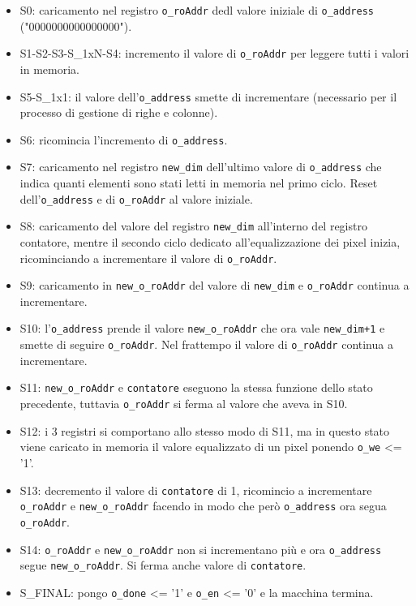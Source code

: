 \documentclass[12pt, table, xcdraw]{article}
\begin{document}
\begin{itemize}
\item S0: caricamento nel registro \texttt{o\_roAddr} dedl valore iniziale di \texttt{o\_address} ("0000000000000000").
\item S1-S2-S3-S\_1xN-S4: incremento il valore di \texttt{o\_roAddr} per leggere tutti i valori in memoria.
\item S5-S\_1x1: il valore dell'\texttt{o\_address} smette di incrementare (necessario per il processo di gestione di righe e colonne).
\item S6: ricomincia l'incremento di \texttt{o\_address}.
\item S7: caricamento nel registro \texttt{new\_dim} dell'ultimo valore di \texttt{o\_address} che indica quanti elementi sono stati letti in memoria nel primo ciclo. Reset dell'\texttt{o\_address} e di \texttt{o\_roAddr} al valore iniziale.
\item S8: caricamento del valore del registro \texttt{new\_dim} all'interno del registro contatore, mentre il secondo ciclo dedicato all'equalizzazione dei pixel inizia, ricominciando a incrementare il valore di \texttt{o\_roAddr}.
\item S9: caricamento in \texttt{new\_o\_roAddr} del valore di \texttt{new\_dim} e \texttt{o\_roAddr} continua a incrementare.
\item S10: l'\texttt{o\_address} prende il valore \texttt{new\_o\_roAddr} che ora vale \texttt{new\_dim+1} e smette di seguire \texttt{o\_roAddr}. Nel frattempo il valore di \texttt{o\_roAddr} continua a incrementare.
\item S11: \texttt{new\_o\_roAddr} e \texttt{contatore} eseguono la stessa funzione dello stato precedente, tuttavia \texttt{o\_roAddr} si ferma al valore che aveva in S10.
\item S12: i 3 registri si comportano allo stesso modo di S11, ma in questo stato viene caricato in memoria il valore equalizzato di un pixel ponendo \texttt{o\_we} \textless = '1'.
\item S13: decremento il valore di \texttt{contatore} di 1, ricomincio a incrementare \texttt{o\_roAddr} e \texttt{new\_o\_roAddr} facendo in modo che però \texttt{o\_address} ora segua \texttt{o\_roAddr}.
\item S14: \texttt{o\_roAddr} e \texttt{new\_o\_roAddr} non si incrementano più e ora \texttt{o\_address} segue \texttt{new\_o\_roAddr}. Si ferma anche valore di \texttt{contatore}.
\item S\_FINAL: pongo \texttt{o\_done} \textless = '1' e \texttt{o\_en} \textless = '0' e la macchina termina.
\end{itemize}
\end{document}
